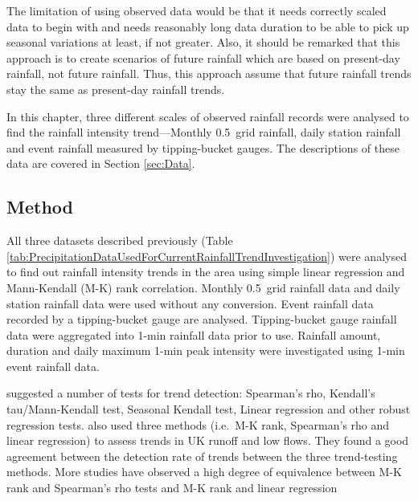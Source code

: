 The limitation of using observed data would be that it needs correctly scaled
data to begin with and needs reasonably long data duration to be able to pick up
seasonal variations at least, if not greater. Also, it should be remarked that
this approach is to create scenarios of future rainfall which are based on
present-day rainfall, not future rainfall. Thus, this approach assume that
future rainfall trends stay the same as present-day rainfall trends.

In this chapter, three different scales of observed rainfall records were
analysed to find the rainfall intensity trend---Monthly 0.5\textdegree\ grid
rainfall, daily station rainfall and event rainfall measured by tipping-bucket
gauges. The descriptions of these data are covered in Section \ref{sec:Data}.

\subsection{Method}
\label{sec:MethodsObservedRainfallCharacteristicInvestigation}
All three datasets described previously (Table
\ref{tab:PrecipitationDataUsedForCurrentRainfallTrendInvestigation}) were
analysed to find out rainfall intensity trends in the area using simple linear
regression and Mann-Kendall (M-K) rank correlation. Monthly 0.5\textdegree\ grid
rainfall data and daily station rainfall data were used without any conversion.
Event rainfall data recorded by a tipping-bucket gauge are analysed.
Tipping-bucket gauge rainfall data were aggregated into 1-min rainfall data
prior to use. Rainfall amount, duration and daily maximum 1-min peak intensity
were investigated using 1-min event rainfall data.

\citet{kundzewicz2004-7} suggested a number of tests for trend detection:
Spearman's rho, Kendall's tau/Mann-Kendall test, Seasonal Kendall test, Linear
regression and other robust regression tests.
\citet{hannaford2006-1237} also used three methods (i.e.\ M-K rank, Spearman's
rho and linear regression) to assess trends in UK runoff and low flows. They
found a good agreement between the detection rate of trends between the three
trend-testing methods.
More studies have observed a high degree of equivalence between M-K rank and
Spearman's rho tests \citep{yue2002-254} and M-K rank and linear regression
\citep{svensson2005-811}

